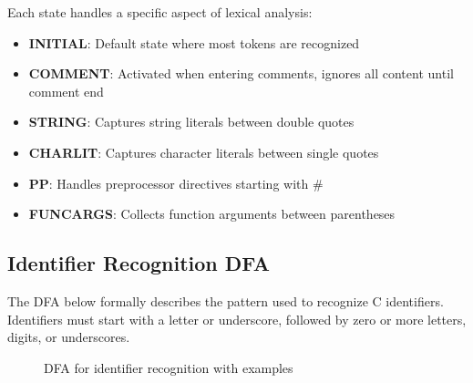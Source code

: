 \documentclass[12pt]{article}
\begin{document}
Each state handles a specific aspect of lexical analysis:
\begin{itemize}
    \item \textbf{INITIAL}: Default state where most tokens are recognized
    \item \textbf{COMMENT}: Activated when entering comments, ignores all content until comment end
    \item \textbf{STRING}: Captures string literals between double quotes
    \item \textbf{CHARLIT}: Captures character literals between single quotes
    \item \textbf{PP}: Handles preprocessor directives starting with \#
    \item \textbf{FUNCARGS}: Collects function arguments between parentheses
\end{itemize}

\subsection{Identifier Recognition DFA}

The DFA below formally describes the pattern used to recognize C identifiers. Identifiers must start with a letter or underscore, followed by zero or more letters, digits, or underscores.

\begin{figure}[H]
\centering
{}
\caption{DFA for identifier recognition with examples}
\end{figure}
\end{document}
